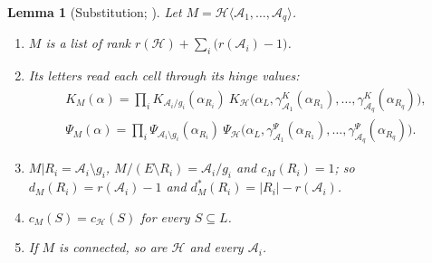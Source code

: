 \documentclass[11pt]{article}
\theoremstyle{plain}
\newtheorem{lemma}[prop]{Lemma}
\theoremstyle{definition}
\theoremstyle{remark}
\begin{document}
\begin{lemma}[Substitution; {\cite[Prop.~20.3, Thm.~20.4, p.~164; Thm.~20.7, p.~165]{F}}]\label{lem:subst}
Let $M=\mathcal H\langle\mathcal A_1,\dots,\mathcal A_q\rangle$.
\begin{enumerate}[label=(\roman*)]
\item $M$ is a list of rank $r(\mathcal H)+\sum_i\big(r(\mathcal A_i)-1\big)$.
\item Its letters read each cell through its hinge values:
\begin{gather*}
K_M(\alpha)=\prod_iK_{\mathcal A_i/g_i}(\alpha_{R_i})\ K_{\mathcal H}\big(\alpha_L,\gamma^K_{\mathcal A_1}(\alpha_{R_1}),\dots,\gamma^K_{\mathcal A_q}(\alpha_{R_q})\big),\\
\Psi_M(\alpha)=\prod_i\Psi_{\mathcal A_i\setminus g_i}(\alpha_{R_i})\ \Psi_{\mathcal H}\big(\alpha_L,\gamma^\Psi_{\mathcal A_1}(\alpha_{R_1}),\dots,\gamma^\Psi_{\mathcal A_q}(\alpha_{R_q})\big).
\end{gather*}
\item $M|R_i=\mathcal A_i\setminus g_i$, $M/(E\setminus R_i)=\mathcal A_i/g_i$ and $c_M(R_i)=1$; so $d_M(R_i)=r(\mathcal A_i)-1$ and $d^\ast_M(R_i)=|R_i|-r(\mathcal A_i)$.
\item $c_M(S)=c_{\mathcal H}(S)$ for every $S\subseteq L$.
\item If $M$ is connected, so are $\mathcal H$ and every $\mathcal A_i$.
\end{enumerate}
\end{lemma}
\end{document}
